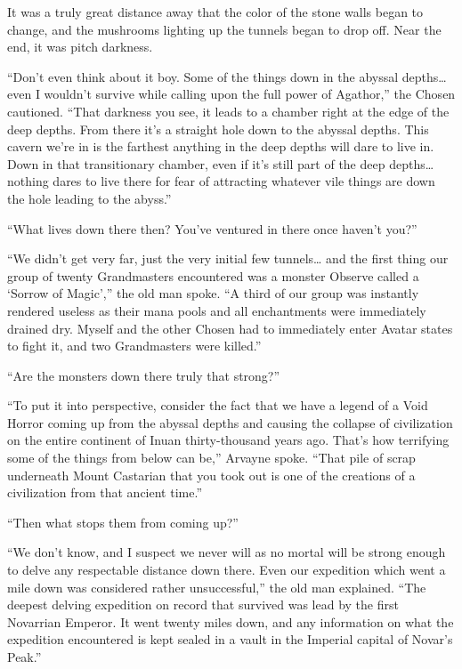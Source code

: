 \documentclass[a4paper,10pt]{book}
\begin{document}
It was a truly great distance away that the color of the stone walls began to change, and the mushrooms lighting up the tunnels began to drop off. Near the end, it was pitch darkness.\par
“Don’t even think about it boy. Some of the things down in the abyssal depths… even I wouldn’t survive while calling upon the full power of Agathor,” the Chosen cautioned. “That darkness you see, it leads to a chamber right at the edge of the deep depths. From there it’s a straight hole down to the abyssal depths. This cavern we’re in is the farthest anything in the deep depths will dare to live in. Down in that transitionary chamber, even if it’s still part of the deep depths… nothing dares to live there for fear of attracting whatever vile things are down the hole leading to the abyss.”\par
“What lives down there then? You’ve ventured in there once haven’t you?”\par
“We didn’t get very far, just the very initial few tunnels… and the first thing our group of twenty Grandmasters encountered was a monster Observe called a ‘Sorrow of Magic’,” the old man spoke. “A third of our group was instantly rendered useless as their mana pools and all enchantments were immediately drained dry. Myself and the other Chosen had to immediately enter Avatar states to fight it, and two Grandmasters were killed.”\par
“Are the monsters down there truly that strong?”\par
“To put it into perspective, consider the fact that we have a legend of a Void Horror coming up from the abyssal depths and causing the collapse of civilization on the entire continent of Inuan thirty-thousand years ago. That’s how terrifying some of the things from below can be,” Arvayne spoke. “That pile of scrap underneath Mount Castarian that you took out is one of the creations of a civilization from that ancient time.”\par
“Then what stops them from coming up?”\par
“We don’t know, and I suspect we never will as no mortal will be strong enough to delve any respectable distance down there. Even our expedition which went a mile down was considered rather unsuccessful,” the old man explained. “The deepest delving expedition on record that survived was lead by the first Novarrian Emperor. It went twenty miles down, and any information on what the expedition encountered is kept sealed in a vault in the Imperial capital of Novar’s Peak.”\par
\end{document}
